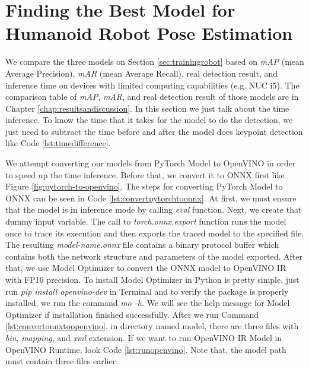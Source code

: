 


\section{Finding the Best Model for Humanoid Robot Pose Estimation}
\label{sec:findingbestmodelhumanoidrobot}

We compare the three models on Section \ref{sec:trainingrobot} based on \emph{mAP} (mean Average Precision), \emph{mAR} (mean Average Recall),
real detection result, and inference time on devices with limited computing capabilities (e.g. NUC i5).
The comparison table of \emph{mAP}, \emph{mAR}, and real detection result of those models are in Chapter \ref{chap:resultsandiscussion}. In this section we just talk about the time inference.
To know the time that it takes for the model to do the detection, we just need to subtract the time before and after the model does keypoint detection like Code \ref{lst:timedifference}.



We attempt converting our models from PyTorch Model to OpenVINO in order to speed up the time inference. Before that, we convert it to ONNX first like Figure \ref{fig:pytorch-to-openvino}.
The steps for converting PyTorch Model to ONNX can be seen in Code \ref{lst:convertpytorchtoonnx}. At first, we must ensure that the model is in inference mode by calling \emph{eval} function.
Next, we create that dummy input variable. The call to \emph{torch.onnx.export} function runs the model once to trace its execution and then exports the traced model to the specified file.
The resulting \emph{model-name.onnx} file contains a binary protocol buffer which contains both the network structure and parameters of the model exported.
After that, we use Model Optimizer to convert the ONNX model to OpenVINO IR with FP16 precision. To install Model Optimizer in Python is pretty simple, just run
\emph{pip install openvino-dev} in Terminal and to verify the package is properly installed, we run the command \emph{mo -h}. We will see the help message for Model Optimizer if installation finished successfully.
After we run Command \ref{lst:convertonnxtoopenvino}, in directory named model, there are three files with \emph{bin}, \emph{mapping}, and \emph{xml} extension.
If we want to run OpenVINO IR Model in OpenVINO Runtime, look Code \ref{lst:runopenvino}. Note that, the model path must contain three files earlier.

